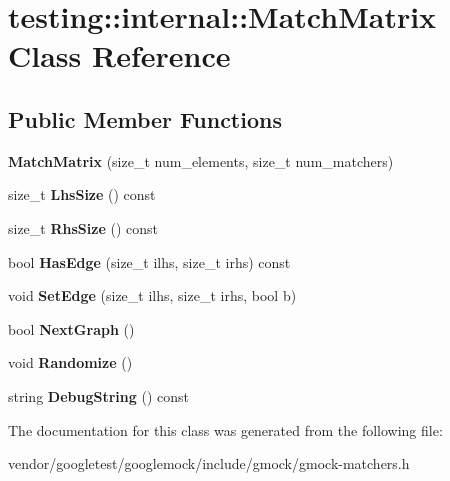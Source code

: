 \hypertarget{classtesting_1_1internal_1_1MatchMatrix}{}\section{testing\+:\+:internal\+:\+:Match\+Matrix Class Reference}
\label{classtesting_1_1internal_1_1MatchMatrix}
\subsection*{Public Member Functions}
\begin{DoxyCompactItemize}
\item 
{\bfseries Match\+Matrix} (size\+\_\+t num\+\_\+elements, size\+\_\+t num\+\_\+matchers)\hypertarget{classtesting_1_1internal_1_1MatchMatrix_afa3313976a69b2a954b2f8b8840c37bb}{}\label{classtesting_1_1internal_1_1MatchMatrix_afa3313976a69b2a954b2f8b8840c37bb}

\item 
size\+\_\+t {\bfseries Lhs\+Size} () const \hypertarget{classtesting_1_1internal_1_1MatchMatrix_ab98f3aa7fd9a536329e495a5016f8d63}{}\label{classtesting_1_1internal_1_1MatchMatrix_ab98f3aa7fd9a536329e495a5016f8d63}

\item 
size\+\_\+t {\bfseries Rhs\+Size} () const \hypertarget{classtesting_1_1internal_1_1MatchMatrix_a5292e007b3d54e2d89e38fa2a9c4e9d9}{}\label{classtesting_1_1internal_1_1MatchMatrix_a5292e007b3d54e2d89e38fa2a9c4e9d9}

\item 
bool {\bfseries Has\+Edge} (size\+\_\+t ilhs, size\+\_\+t irhs) const \hypertarget{classtesting_1_1internal_1_1MatchMatrix_a57dc17758dbb54baed8e7294df8f16fc}{}\label{classtesting_1_1internal_1_1MatchMatrix_a57dc17758dbb54baed8e7294df8f16fc}

\item 
void {\bfseries Set\+Edge} (size\+\_\+t ilhs, size\+\_\+t irhs, bool b)\hypertarget{classtesting_1_1internal_1_1MatchMatrix_aac7e9c6e0e4b51e6b1334829a0781021}{}\label{classtesting_1_1internal_1_1MatchMatrix_aac7e9c6e0e4b51e6b1334829a0781021}

\item 
bool {\bfseries Next\+Graph} ()\hypertarget{classtesting_1_1internal_1_1MatchMatrix_a3a35e2d6107c225537d7e776465a7893}{}\label{classtesting_1_1internal_1_1MatchMatrix_a3a35e2d6107c225537d7e776465a7893}

\item 
void {\bfseries Randomize} ()\hypertarget{classtesting_1_1internal_1_1MatchMatrix_aff1f0ae748f4a5c96117c0f27b493ac6}{}\label{classtesting_1_1internal_1_1MatchMatrix_aff1f0ae748f4a5c96117c0f27b493ac6}

\item 
string {\bfseries Debug\+String} () const \hypertarget{classtesting_1_1internal_1_1MatchMatrix_a0bfd9e3494fe211c9147aea6867ae7c4}{}\label{classtesting_1_1internal_1_1MatchMatrix_a0bfd9e3494fe211c9147aea6867ae7c4}

\end{DoxyCompactItemize}


The documentation for this class was generated from the following file\+:\begin{DoxyCompactItemize}
\item 
vendor/googletest/googlemock/include/gmock/gmock-\/matchers.\+h\end{DoxyCompactItemize}
